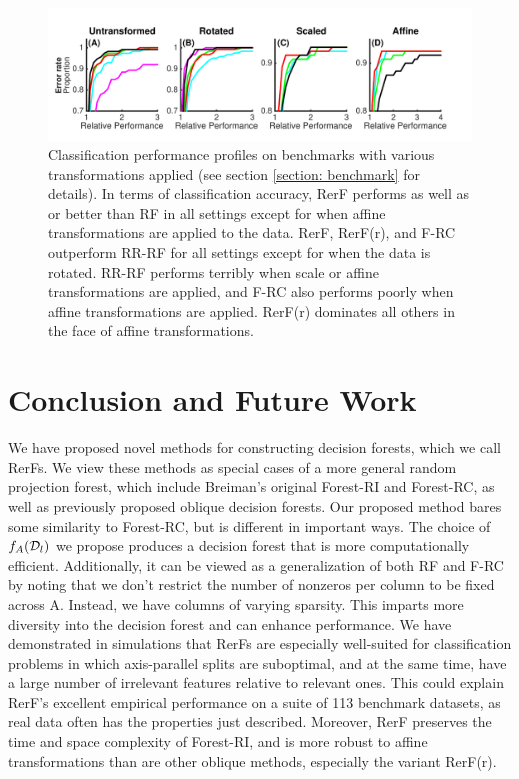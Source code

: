\begin{figure}[ht]
\vskip 0.2in
\begin{center}
\centerline{\includegraphics[width=\columnwidth]{Fig4_benchmark}}
\caption{Classification performance profiles on benchmarks with various transformations applied (see section \ref{section: benchmark} for details). In terms of classification accuracy, RerF performs as well as or better than RF in all settings except for when affine transformations are applied to the data. RerF, RerF(r), and F-RC outperform RR-RF for all settings except for when the data is rotated. RR-RF performs terribly when scale or affine transformations are applied, and F-RC also performs poorly when affine transformations are applied. RerF(r) dominates all others in the face of affine transformations.}
\label{benchmark}
\end{center}
\vskip -0.2in
\end{figure}

\section{Conclusion and Future Work}

We have proposed novel methods for constructing decision forests, which we call RerFs. We view these methods as special cases of a more general random projection forest, which include Breiman's original Forest-RI and Forest-RC, as well as previously proposed oblique decision forests. Our proposed method bares some similarity to Forest-RC, but is different in important ways. The choice of $f_A(\mathcal{D}_l)$ we propose produces a decision forest that is more computationally efficient. Additionally, it can be viewed as a generalization of both RF and F-RC by noting that we don't restrict the number of nonzeros per column to be fixed across A. Instead, we have columns of varying sparsity. This imparts more diversity into the decision forest and can enhance performance. We have demonstrated in simulations that RerFs are especially well-suited for classification problems in which axis-parallel splits are suboptimal, and at the same time, have a large number of irrelevant features relative to relevant ones. This could explain RerF's excellent empirical performance on a suite of 113 benchmark datasets, as real data often has the properties just described. Moreover, RerF preserves the time and space complexity of Forest-RI, and is more robust to affine transformations than are other oblique methods, especially the variant RerF(r).

